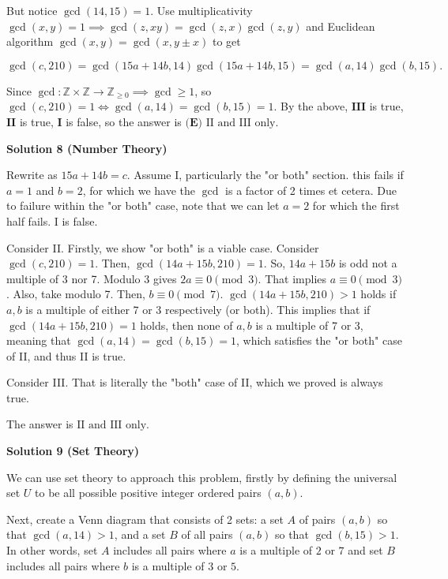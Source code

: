 \begin{enumerate}
 But notice $\gcd(14,15)=1$. Use multiplicativity $\gcd(x,y)=1\implies \gcd(z,xy)=\gcd(z,x)\gcd(z,y)$ and Euclidean algorithm $\gcd(x,y)=\gcd(x,y\pm x)$ to get

 
 \[\gcd(c,210)=\gcd(15a+14b,14)\gcd(15a+14b,15)=\gcd(a,14)\gcd(b,15).\]

 Since $\gcd: \mathbb{Z}\times \mathbb{Z}\to \mathbb{Z}_{\ge 0} \implies \gcd\ge 1$, so $\gcd(c,210)=1\iff \gcd(a,14)=\gcd(b,15)=1$. By the above, $\mathbf{III}$ is true, $\mathbf{II}$ is true, $\mathbf{I}$ is false, so the answer is $\boxed{\textbf{(E) }\text{II and III only}}$.

 



\textbf{Solution 8 (Number Theory)}

Rewrite as $15a + 14b = c$. Assume I, particularly the "or both" section. this fails if $a = 1$ and $b = 2$, for which we have the $\gcd$ is a factor of 2 times et cetera. Due to failure within the "or both" case, note that we can let $a = 2$ for which the first half fails. I is false.

 Consider II. Firstly, we show "or both" is a viable case. Consider $\gcd(c,210) = 1$. Then, $\gcd(14a+15b,210) = 1$. So, $14a+15b$ is odd not a multiple of 3 nor 7. Modulo 3 gives $2a \equiv 0 \pmod{3}$. That implies $a \equiv 0 \pmod{3}$. Also, take modulo 7. Then, $b \equiv 0 \pmod{7}$. $\gcd(14a+15b, 210) > 1$ holds if $a,b$ is a multiple of either 7 or 3 respectively (or both). This implies that if $\gcd(14a+15b, 210) = 1$ holds, then none of $a,b$ is a multiple of 7 or 3, meaning that $\gcd(a,14) = \gcd(b,15) = 1$, which satisfies the "or both" case of II, and thus II is true.

 Consider III. That is literally the "both" case of II, which we proved is always true.

 The answer is $\boxed{\text{II and III only}}$.

 



\textbf{Solution 9 (Set Theory)}

We can use set theory to approach this problem, firstly by defining the universal set $U$ to be all possible positive integer ordered pairs $(a, b)$.

 Next, create a Venn diagram that consists of 2 sets: a set $A$ of pairs $(a, b)$ so that $\gcd(a, 14) > 1$, and a set $B$ of all pairs $(a, b)$ so that $\gcd(b, 15) > 1$. In other words, set $A$ includes all pairs where $a$ is a multiple of $2$ or $7$ and set $B$ includes all pairs where $b$ is a multiple of $3$ or $5$. 


\end{enumerate}
